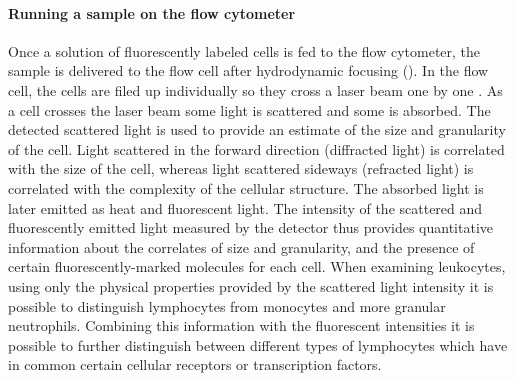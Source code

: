 \paragraph{Running a sample on the flow cytometer}
Once a solution of fluorescently labeled cells is fed to the flow cytometer,
the sample is delivered to the flow cell after hydrodynamic focusing ().
In the flow cell, the cells are filed up individually so they cross a laser beam one by one \citep{Shapiro:2003vq}.
As a cell crosses the laser beam some light is scattered and some is absorbed. The detected scattered light is used to provide an estimate of the size and granularity of the cell.
Light scattered in the forward direction (diffracted light) is correlated with the size of the cell, whereas light scattered sideways (refracted light) is correlated with the complexity of the cellular structure.
The absorbed light is later emitted as heat and fluorescent light.
The intensity of the scattered and fluorescently emitted light measured by the detector thus provides quantitative information about the correlates of size and granularity,
and the presence of certain fluorescently-marked molecules for each cell.
When examining leukocytes, using only the physical properties provided by the scattered light intensity it is possible to distinguish lymphocytes from monocytes and more granular neutrophils.
Combining this information with the fluorescent intensities it is possible to further distinguish between different types of lymphocytes which have in common certain cellular receptors or transcription factors.

